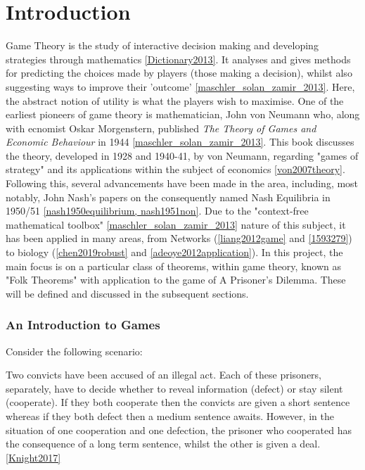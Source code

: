 \chapter{Introduction}

Game Theory is the study of interactive decision making and developing
strategies through mathematics \ref{Dictionary2013}. It analyses and gives
methods for predicting the choices made by players (those making a decision),
whilst also suggesting ways to improve their 'outcome'
\ref{maschler_solan_zamir_2013}. Here, the abstract notion of utility is what
the players wish to maximise. One of the earliest
pioneers of game theory is mathematician, John von Neumann who, along with
ecnomist Oskar Morgenstern, published \textit{The Theory of Games and Economic
Behaviour} in 1944 \ref{maschler_solan_zamir_2013}. This book discusses the
theory, developed in 1928 and 1940-41, by von Neumann, regarding "games of
strategy" and its applications within the subject of economics
\ref{von2007theory}. Following this, several advancements have been made in the
area, including, most notably, John Nash's papers on the consequently named Nash
Equilibria in 1950/51 \ref{nash1950equilibrium, nash1951non}. Due to the
"context-free mathematical toolbox" \ref{maschler_solan_zamir_2013} nature of
this subject, it has been applied in many areas, from Networks
(\ref{liang2012game} and \ref{1593279}) to biology (\ref{chen2019robust} and
\ref{adeoye2012application}). In this project, the main focus is on a particular
class of theorems, within game theory, known as "Folk Theorems" with application
to the game of A Prisoner's Dilemma. These will be defined and discussed in the
subsequent sections.

\subsection{An Introduction to Games}
Consider the following scenario:

\begin{center}
    Two convicts have been accused of an illegal act. Each of these prisoners,
    separately, have to decide whether to reveal information (defect) or stay
    silent (cooperate). If they both cooperate then the convicts are given a
    short sentence whereas if they both defect then a medium sentence awaits.
    However, in the situation of one cooperation and one defection, the prisoner
    who cooperated has the consequence of a long term sentence, whilst the other
    is given a deal. \ref{Knight2017}
\end{center}

